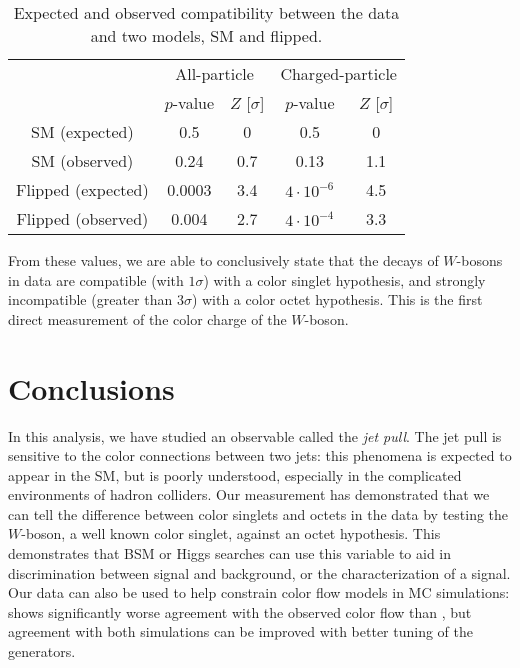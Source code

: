 \begin{table}
    \centering
    \begin{tabular}{ ccc|cc }
      \hline
      & \multicolumn{2}{c}{All-particle} & \multicolumn{2}{c}{Charged-particle}          \\
                         & $p$-value & $Z$ [$\sigma$] & $p$-value       & $Z$ [$\sigma$] \\
      \hline
      SM (expected)      & 0.5       & 0              & 0.5             & 0              \\
      SM (observed)      & 0.24      & 0.7            & 0.13            & 1.1            \\
      Flipped (expected) & 0.0003    & 3.4            & $4\cdot10^{-6}$  & 4.5            \\
      Flipped (observed) & 0.004     & 2.7            & $4\cdot10^{-4}$ & 3.3            \\
    \end{tabular}
    \caption{Expected and observed compatibility between the data and two models,
    SM and flipped.}
    \label{tab:color:unfolding:interpretation}
\end{table}


	From these values, we are able to conclusively state that the decays of $W$-bosons in data are compatible (with $1\sigma$) with a color singlet hypothesis, and strongly incompatible (greater than $3\sigma$) with a color octet hypothesis. This is the first direct measurement of the color charge of the $W$-boson.

\FloatBarrier

\section{Conclusions}

In this analysis, we have studied an observable called the \textit{jet pull}. The jet pull is sensitive to the color connections between two jets: this phenomena is expected to appear in the SM, but is poorly understood, especially in the complicated environments of hadron colliders. Our measurement has demonstrated that we can tell the difference between color singlets and octets in the data by testing the $W$-boson, a well known color singlet, against an octet hypothesis. This demonstrates that BSM or Higgs searches can use this variable to aid in discrimination between signal and background, or the characterization of a signal. Our data can also be used to help constrain color flow models in MC simulations: \Herwigpp shows significantly worse agreement with the observed color flow than \Pythia, but agreement with both simulations can be improved with better tuning of the generators.

